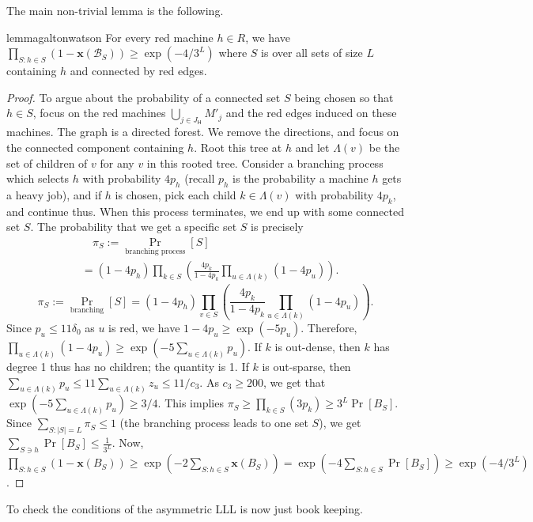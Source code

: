 \documentclass[11pt]{article}
\newcommand{\cB}{\mathscr{B}}
\newcommand{\sfH}{{\mathsf H}}
\newcommand{\x}{{\mathbf x}}
\begin{document}
The main non-trivial lemma is the following.
\begin{restatable}{lemma}{galtonwatson}
\label{lem:galton-watson}
For every red machine $h \in R$, we have $\prod_{S: h\in S} \left(1-\x(\cB_S)\right) \geq \exp(-4/3^L)$ where $S$ is over all sets of size $L$ containing $h$ and connected by red edges.
\end{restatable}
\begin{proof} To argue about the probability of a connected set $S$ being chosen so that $h\in S$,  focus on the red machines $\bigcup_{j \in J_\sfH}M'_j$ and the red edges induced on these machines.  The graph is a directed forest. We remove the directions, and focus on the connected component containing $h$. Root this tree at $h$ and let $\Lambda(v)$ be the set of children of $v$ for any $v$ in this rooted tree. Consider a branching process which selects $h$ with probability $4p_h$ (recall $p_h$ is the probability a machine $h$ gets a heavy job), and if $h$ is chosen, pick each child $k \in \Lambda(v)$ with probability $4p_k$, and continue thus.
When this process terminates, we end up with some connected set $S$. The probability that we get a specific set $S$  is precisely 
\ifdefined\CR
\begin{align*}
&\quad \pi_S := \Pr_{\text{branching process}} [S] \\
&= (1-4p_h) \prod_{k \in S}\left(\frac{4p_k}{1-4p_k}\prod_{u \in \Lambda(k)} \left(1-4p_u\right) \right).
\end{align*}
\else
$$\textstyle \pi_S := \Pr_{\text{branching}} [S] = (1-4p_h) \prod_{v\in S}\left(\frac{4p_k}{1-4p_k}\prod_{u \in \Lambda(k)} \left(1-4p_u\right) \right).$$
\fi
Since $p_u \leq 11\delta_0$ as $u$ is red, we have $1-4p_u \geq \exp(-5p_u)$. Therefore, $\prod_{u \in \Lambda(k)} \left(1-4p_u\right)\geq \exp\left(-5\sum_{u\in \Lambda(k)} p_u\right)$. If $k$ is out-dense, then $k$ has degree 1 thus has no children; the quantity is 1.
If $k$ is out-sparse, then $\sum_{u\in \Lambda(k)} p_u \leq 11\sum_{u\in \Lambda(k)} z_u \leq 11/c_3$. As $c_3 \geq 200$, we get that  $\exp\left(-5\sum_{u\in \Lambda(k)} p_u\right) \geq 3/4$. This implies $\pi_S \geq \prod_{k\in S}(3p_k) \geq 3^L\Pr[B_S]$.
Since $\sum_{S: |S| = L} \pi_S \leq 1$ (the branching process leads to one set $S$), we get $\sum_{S \ni h} \Pr[B_S] \leq \frac{1}{3^L}$.
Now, 
$\prod_{S: h\in S} \left(1-\x(B_S)\right) \geq \exp(-2\sum_{S:h\in S} \x(B_S)) = \exp(-4\sum_{S:h\in S} \Pr[B_S]) \geq \exp(-4/3^L)$.
\end{proof}
\noindent
To check the conditions of the asymmetric LLL is now just book keeping. 
\end{document}
